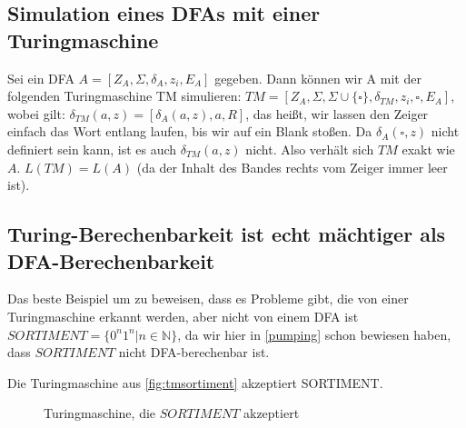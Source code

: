 \subsection{Simulation eines DFAs mit einer Turingmaschine}
Sei ein DFA $A = [Z_A, \Sigma, \delta_A, z_i, E_A]$ gegeben.
Dann können wir A mit der folgenden Turingmaschine TM simulieren:
$TM = [Z_A, \Sigma, \Sigma \cup \{\square\}, \delta_{TM}, z_i, \square, E_A]$,
wobei gilt:
$\delta_{TM}(a, z) = [\delta_A(a, z), a, R]$,
das heißt, wir lassen den Zeiger einfach das Wort entlang laufen,
bis wir auf ein Blank stoßen.
Da $\delta_A(\square, z)$ nicht definiert sein kann,
ist es auch $\delta_{TM}(a,z)$ nicht.
Also verhält sich $TM$ exakt wie $A$.
$L(TM) = L(A)$ (da der Inhalt des Bandes rechts vom Zeiger immer leer ist).

\subsection{Turing-Berechenbarkeit ist echt mächtiger als DFA-Berechenbarkeit}
Das beste Beispiel um zu beweisen,
dass es Probleme gibt, die von einer Turingmaschine erkannt werden,
aber nicht von einem DFA ist $SORTIMENT = \{0^n1^n| n \in \mathbb{N}\}$,
da wir hier in \autoref{pumping} schon bewiesen haben,
dass $SORTIMENT$ nicht DFA-berechenbar ist.

Die Turingmaschine aus \autoref{fig:tmsortiment} akzeptiert SORTIMENT.

\begin{figure}[ht] %
\centering %
\caption{Turingmaschine, die $SORTIMENT$ akzeptiert}
\label{fig:tmsortiment}
\end{figure}

